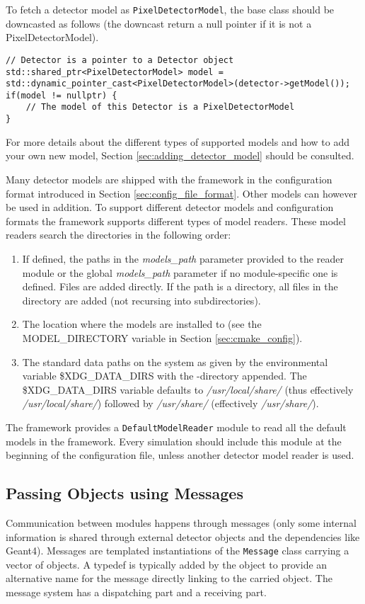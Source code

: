 To fetch a detector model as \texttt{PixelDetectorModel}, the base class should be downcasted as follows (the downcast return a null pointer if it is not a PixelDetectorModel).
\begin{verbatim}
// Detector is a pointer to a Detector object
std::shared_ptr<PixelDetectorModel> model = std::dynamic_pointer_cast<PixelDetectorModel>(detector->getModel());
if(model != nullptr) {
    // The model of this Detector is a PixelDetectorModel
}
\end{verbatim}
For more details about the different types of supported models and how to add your own new model, Section \ref{sec:adding_detector_model} should be consulted.

Many detector models are shipped with the framework in the configuration format introduced in Section \ref{sec:config_file_format}. Other models can however be used in addition. To support different detector models and configuration formats the framework supports different types of model readers. These model readers search the directories in the following order:
\begin{enumerate}
\item If defined, the paths in the \textit{models\_path} parameter provided to the reader module or the global \textit{models\_path} parameter if no module-specific one is defined. Files are added directly. If the path is a directory, all files in the directory are added (not recursing into subdirectories).
\item The location where the models are installed to (see the MODEL\_DIRECTORY variable in Section \ref{sec:cmake_config}). 
\item The standard data paths on the system as given by the environmental variable \$XDG\_DATA\_DIRS with the \project-directory appended. The \$XDG\_DATA\_DIRS variable defaults to \textit{/usr/local/share/} (thus effectively \textit{/usr/local/share/\project}) followed by \textit{/usr/share/} (effectively \textit{/usr/share/\project}).
\end{enumerate}
The framework provides a \texttt{DefaultModelReader} module to read all the default models in the framework. Every simulation should include this module at the beginning of the configuration file, unless another detector model reader is used.


\subsection{Passing Objects using Messages}
\label{sec:objects_messages}
Communication between modules happens through messages (only some internal information is shared through external detector objects and the dependencies like Geant4). Messages are templated instantiations of the \texttt{Message} class carrying a vector of objects. A typedef is typically added by the object to provide an alternative name for the message directly linking to the carried object. The message system has a dispatching part and a receiving part. 

